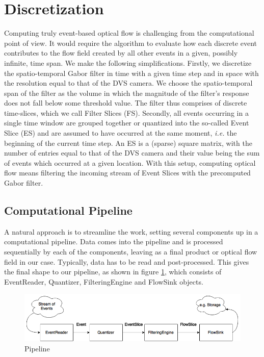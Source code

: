 \section{Discretization}

Computing truly event-based optical flow is challenging from the computational point of view. 
It would require the algorithm to evaluate how each discrete event contributes to the flow field created by all other events in a given, possibly infinite, time span.
We make the following simplifications.
Firstly, we discretize the spatio-temporal Gabor filter in time with a given time step and in space with the resolution equal to that of the DVS camera.
We choose the spatio-temporal span of the filter as the volume in which the magnitude of the filter's response does not fall below some threshold value.
The filter thus comprises of discrete time-slices, which we call Filter Slices (FS).
Secondly, all events occurring in a single time window are grouped together or quantized into the so-called Event Slice (ES) and are assumed to have occurred at the same moment, \emph{i.e.} the beginning of the current time step. 
An ES is a (sparse) square matrix, with the number of entries equal to that of the DVS camera and their value being the sum of events which occurred at a given location. 
With this setup, computing optical flow means filtering the incoming stream of Event Slices with the precomputed Gabor filter.


\subsection{Computational Pipeline}
A natural approach is to streamline the work, setting several components up in a computational pipeline.
Data comes into the pipeline and is processed sequentially by each of the components, leaving as a final product or optical flow field in our case. 
Typically, data has to be read and post-processed.
This gives the final shape to our pipeline, as shown in figure \ref{fig:pipeline}, which consists of EventReader, Quantizer, FilteringEngine and FlowSink objects.

\begin{figure}[ht!]
 \label{fig:pipeline}
 \includegraphics[width=\textwidth]{figs/pipeline}
 \caption{Pipeline}
\end{figure}

